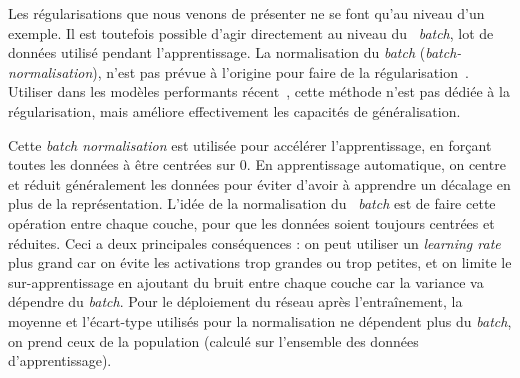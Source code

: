 Les régularisations que nous venons de présenter ne se font qu'au niveau d'un exemple.
Il est toutefois possible d'agir directement au niveau du ~\textit{batch}, lot de données utilisé pendant l'apprentissage.
La normalisation du \textit{batch} (\textit{batch-normalisation}), n'est pas prévue à l'origine pour faire de la régularisation~\cite{ioffe2015batch}.
Utiliser dans les modèles performants récent~\cite{szegedy2016rethinking, he2016deep, hu2017squeeze}, cette méthode n'est pas dédiée à la régularisation, mais améliore effectivement les capacités de généralisation. 

\vspace{5mm}
\begin{center}
\end{center}
\vspace{5mm}


Cette \textit{batch normalisation} est utilisée pour accélérer l'apprentissage, en forçant toutes les données à être centrées sur 0.
En apprentissage automatique, on centre et réduit généralement les données pour éviter d'avoir à apprendre un décalage en plus de la représentation.
L'idée de la normalisation du ~\textit{batch} est de faire cette opération entre chaque couche, pour que les données soient toujours centrées et réduites.
Ceci a deux principales conséquences : on peut utiliser un \textit{learning rate} plus grand car on évite les activations trop grandes ou trop petites, et on limite le sur-apprentissage en ajoutant du bruit entre chaque couche car la variance va dépendre du \textit{batch}.
Pour le déploiement du réseau après l'entraînement, la moyenne et l'écart-type utilisés pour la normalisation ne dépendent plus du \textit{batch}, on prend ceux de la population (calculé sur l'ensemble des données d'apprentissage).

